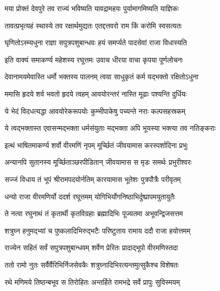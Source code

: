 \twolineshloka
{मया प्रोक्तं देवपुरे तव राज्यं भविष्यति}
{यावद्रामहयः पुर्यामागमिष्यति याज्ञिकः}%

\twolineshloka
{तावत्प्रभृत्यहं स्थास्ये तव रक्षार्थमुद्यतः}
{एतद्दत्तवरो राम किं करोमि स्वसत्यतः}%

\twolineshloka
{घृणितोऽस्म्यधुना राज्ञा सपुत्रपशुबान्धवः}
{हयं समर्प्यते पादसेवां राजा विधास्यति}%


\twolineshloka
{इति वाक्यं समाकर्ण्य महेशस्य रघूत्तमः}
{उवाच धीरया वाचा कृपया पूर्णलोचनः}%


\twolineshloka
{देवानामयमेवास्ति धर्मो भक्तस्य पालनम्}
{त्वया साधुकृतं कर्म यद्भक्तो रक्षितोऽधुना}%

\twolineshloka
{ममासि हृदये शर्व भवतो हृदये त्वहम्}
{आवयोरन्तरं नास्ति मूढाः पश्यन्ति दुर्धियः}%

\twolineshloka
{ये भेदं विदधत्यद्धा आवयोरेकरूपयोः}
{कुम्भीपाकेषु पच्यन्ते नराः कल्पसहस्रकम्}%

\twolineshloka
{ये त्वद्भक्तास्त एवासन्मद्भक्ता धर्मसंयुताः}
{मद्भक्ता अपि भूयस्या भक्त्या तव नतिङ्कराः}%


\twolineshloka
{इत्थं भाषितमाकर्ण्य शर्वो वीरमणिं नृपम्}
{मूर्च्छितं जीवयामास करस्पर्शादिना प्रभुः}%

\twolineshloka
{अन्यानपि सुतानस्य मूर्च्छिताञ्छरपीडितान्}
{जीवयामास स मृडः समर्थः प्रभुरीश्वरः}%

\twolineshloka
{सज्जं विधाय तं भूपं श्रीरामपदयोर्नतिम्}
{कारयामास भूतेशः पुत्रपौत्रैः परीवृतम्}%

\twolineshloka
{धन्यो राजा वीरमणिर्यो ददर्श रघूत्तमम्}
{योगिभिर्योगनिष्ठाभिर्दुष्प्रापमयुतायुतैः}%

\twolineshloka
{ते नत्वा रघुनाथं तं कृतार्थी कृतविग्रहाः}
{ब्रह्मादिभिः पूज्यतमा अभूवन्द्विजसत्तम}%

\twolineshloka
{शत्रुघ्न हनुमद्भ्यां च पुष्कलादिभिरुद्भटैः}
{परिष्टुताय रामाय ददौ राजा हयोत्तमम्}%

\twolineshloka
{राज्येन सहितं सर्वं सपुत्रपशुबान्धवम्}
{शर्वेण प्रेरितः प्रादाद्भूपो वीरमणिस्तदा}%

\twolineshloka
{ततो रामो नुतः सर्वैर्वैरिभिर्निजसेवकैः}
{शत्रुघ्नादिभिरत्यन्तमुत्सुकैश्च विशेषतः}%

\twolineshloka
{रथे मणिमये तिष्ठन्बभूव स तिरोहितः}
{अन्तर्हिते रामभद्रे सर्वे प्रापुः सुविस्मयम्}%

